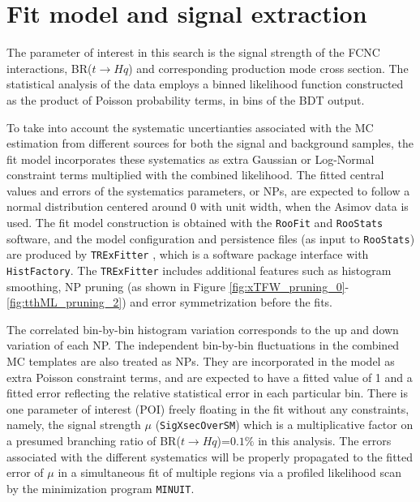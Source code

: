 \section{Fit model and signal extraction}
\label{sec:fit}

The parameter of interest in this search is the signal strength of the FCNC interactions, BR($t\to Hq$) and corresponding production mode cross section. The statistical analysis of the data employs a binned likelihood function constructed as the product of Poisson probability terms, in bins of the BDT output.

To take into account the systematic uncertianties associated with the MC estimation from different sources for both the signal and background samples, the fit model incorporates these systematics as extra Gaussian or Log-Normal constraint terms multiplied with the combined likelihood. The fitted central values and errors of the systematics parameters, or NPs, are expected to follow a normal distribution centered around 0 with unit width, when the Asimov data is used. The fit model construction is obtained with the \texttt{RooFit} and \texttt{RooStats} software, and the model configuration and persistence files (as input to \texttt{RooStats}) are produced by \texttt{TRExFitter} \cite{TRExFitter}, which is a software package interface with \texttt{HistFactory}. The \texttt{TRExFitter} includes additional features such as histogram smoothing, NP pruning (as shown in Figure \ref{fig:xTFW_pruning_0}-\ref{fig:tthML_pruning_2}) and error symmetrization before the fits.

The correlated bin-by-bin histogram variation corresponds to the up and down variation of each NP. The independent bin-by-bin fluctuations in the combined MC templates are also treated as NPs. They are incorporated in the model as extra Poisson constraint terms, and are expected to have a fitted value of 1 and a fitted error reflecting the relative statistical error in each particular bin. There is one parameter of interest (POI) freely floating in the fit without any constraints, namely, the signal strength $\mu$ (\texttt{SigXsecOverSM}) which is a multiplicative factor on a presumed branching ratio of BR($t\to Hq$)=$0.1\%$ in this analysis. The errors associated with the different systematics will be properly propagated to the fitted error of $\mu$ in a simultaneous fit of multiple regions via a profiled likelihood scan by the minimization program \texttt{MINUIT}. 


